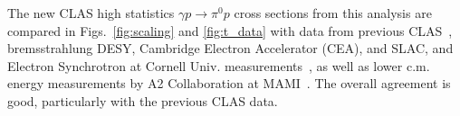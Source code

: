 \documentclass[aps,prc,twocolumn,floatfix,showpacs,preprintnumbers,amsmath,amssymb,superscriptaddress,linenumbers]{revtex4-1}
\begin{document}
The new CLAS high statistics $\gamma p \to \pi^0 p$ cross sections from
this analysis are compared in Figs.~\ref{fig:scaling}
and \ref{fig:t_data} with data from previous CLAS~\cite{Dugger:2007bt},  bremsstrahlung DESY, Cambridge
Electron Accelerator (CEA), and SLAC, and Electron Synchrotron at
Cornell Univ. measurements~\cite{brem}, as
well as lower c.m. energy measurements by A2 Collaboration at MAMI~\protect\cite{Adlarson:2015byy}.
%
The overall agreement is good,
particularly with the previous CLAS data.
\end{document}
